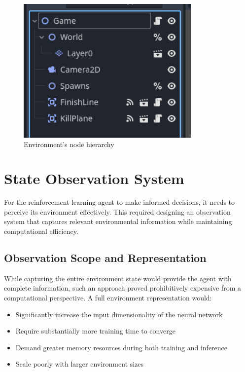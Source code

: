 \begin{figure}[H]
    \centering
    \includegraphics[width=0.8\textwidth]{figures/godot_nodes_basic.png}
    \caption{Environment's node hierarchy}
    \label{fig:godot_nodes_basic}
\end{figure}

\section{State Observation System}

For the reinforcement learning agent to make informed decisions, it needs to perceive its environment effectively. 
This required designing an observation system that captures relevant environmental information while maintaining computational efficiency.

\subsection{Observation Scope and Representation}

While capturing the entire environment state would provide the agent with complete information, such an approach proved prohibitively expensive from a computational perspective. A full environment representation would:

\begin{itemize}
    \item Significantly increase the input dimensionality of the neural network
    \item Require substantially more training time to converge
    \item Demand greater memory resources during both training and inference
    \item Scale poorly with larger environment sizes
\end{itemize}

